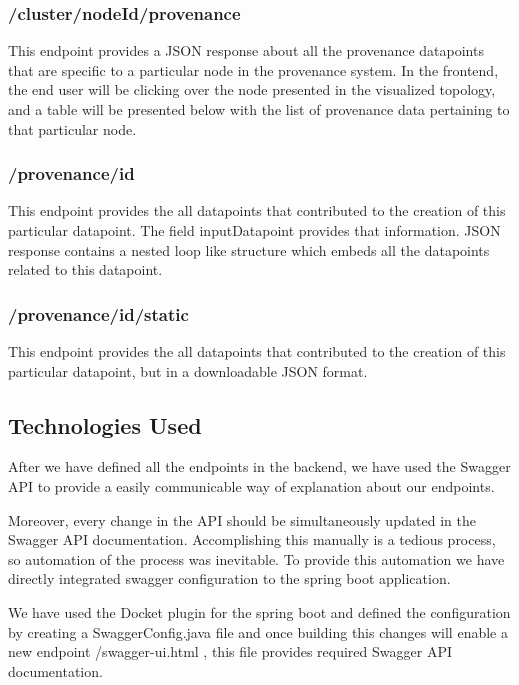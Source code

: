 \subsubsection{/cluster/{nodeId}/provenance}

This endpoint provides a JSON response about all the provenance datapoints that are specific to a particular node in the provenance system. In the frontend, the end user will be clicking over the node presented in the visualized topology, and a table will be presented below with the list of provenance data pertaining to that particular node.

\subsubsection{/provenance/{id}}

This endpoint provides the all datapoints that contributed to the creation of this particular datapoint. The field inputDatapoint provides that information. JSON response contains a nested loop like structure which embeds all the datapoints related to this datapoint. 

\subsubsection{/provenance/{id}/static}

This endpoint provides the all datapoints that contributed to the creation of this particular datapoint, but in a downloadable JSON format.

\subsection{Technologies Used}

After we have defined all the endpoints in the backend, we have used the Swagger API to provide a easily communicable way of explanation about our endpoints. 

Moreover, every change in the API should be simultaneously updated in the Swagger API documentation. Accomplishing this manually is a tedious process, so automation of the process was inevitable. To provide this automation we have directly integrated swagger configuration to the spring boot application.

We have used the Docket plugin for the spring boot and defined the configuration by creating a SwaggerConfig.java file and once building this changes will enable a new endpoint /swagger-ui.html , this file provides required Swagger API documentation.


